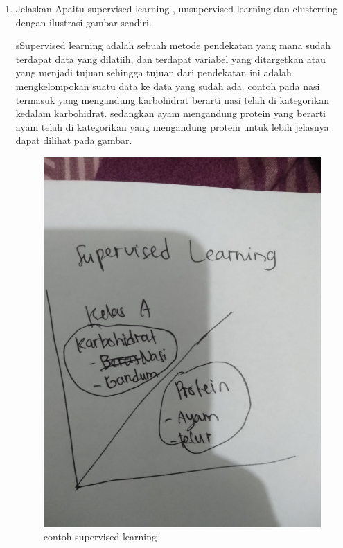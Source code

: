 \begin{enumerate}
\item Jelaskan Apaitu supervised learning , unsupervised learning dan clusterring dengan ilustrasi gambar sendiri.\par
sSupervised learning adalah sebuah metode pendekatan yang mana sudah terdapat data yang dilatiih, dan terdapat variabel yang ditargetkan atau yang menjadi tujuan sehingga tujuan dari pendekatan ini adalah mengkelompokan suatu data ke data yang sudah ada.  contoh pada nasi termasuk yang mengandung karbohidrat berarti nasi telah di kategorikan kedalam karbohidrat. sedangkan ayam mengandung protein yang berarti ayam telah di kategorikan  yang mengandung protein untuk lebih jelasnya dapat dilihat pada gambar.\par
\begin{figure}[ht]
\centering
\includegraphics[scale=0.01]{figures/1174050/chapter2/2.jpg}
\caption{contoh supervised learning}
\label{contoh}
\end{figure}


\end{enumerate}
